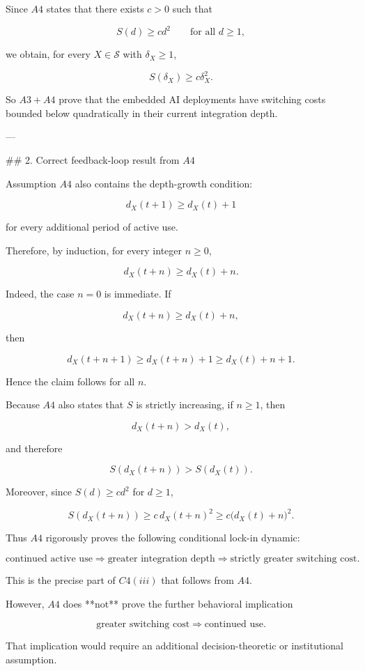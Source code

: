 Since \(A4\) states that there exists \(c>0\) such that

\[
S(d)\ge c d^2
\qquad\text{for all } d\ge 1,
\]

we obtain, for every \(X\in\mathcal S\) with \(\delta_X\ge 1\),

\[
S(\delta_X)\ge c\delta_X^2.
\]

So \(A3+A4\) prove that the embedded AI deployments have switching costs bounded below quadratically in their current integration depth.

---

## 2. Correct feedback-loop result from \(A4\)

Assumption \(A4\) also contains the depth-growth condition:

\[
d_X(t+1)\ge d_X(t)+1
\]

for every additional period of active use.

Therefore, by induction, for every integer \(n\ge 0\),

\[
d_X(t+n)\ge d_X(t)+n.
\]

Indeed, the case \(n=0\) is immediate. If

\[
d_X(t+n)\ge d_X(t)+n,
\]

then

\[
d_X(t+n+1)\ge d_X(t+n)+1\ge d_X(t)+n+1.
\]

Hence the claim follows for all \(n\).

Because \(A4\) also states that \(S\) is strictly increasing, if \(n\ge 1\), then

\[
d_X(t+n)>d_X(t),
\]

and therefore

\[
S(d_X(t+n))>S(d_X(t)).
\]

Moreover, since \(S(d)\ge c d^2\) for \(d\ge 1\),

\[
S(d_X(t+n))
\ge c\,d_X(t+n)^2
\ge c\bigl(d_X(t)+n\bigr)^2.
\]

Thus \(A4\) rigorously proves the following conditional lock-in dynamic:

\[
\text{continued active use}
\Longrightarrow
\text{greater integration depth}
\Longrightarrow
\text{strictly greater switching cost}.
\]

This is the precise part of \(C4(iii)\) that follows from \(A4\).

However, \(A4\) does **not** prove the further behavioral implication

\[
\text{greater switching cost}
\Longrightarrow
\text{continued use}.
\]

That implication would require an additional decision-theoretic or institutional assumption.

